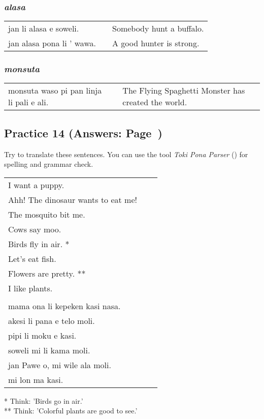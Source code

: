 \subsubsection*{\textit{alasa}}
\begin{supertabular}{p{5,5cm}|ll}
jan li alasa e soweli. && Somebody hunt a buffalo. \\
jan alasa pona li ' wawa. && A good hunter is strong. \\
\end{supertabular}

\subsubsection*{\textit{monsuta}}
\begin{supertabular}{p{5,5cm}|ll}
monsuta waso pi pan linja li pali e ali. &&  The Flying Spaghetti Monster has created the world. \\
\end{supertabular}

\newpage
\subsection*{Practice 14 (Answers: Page~\pageref{'living_things'})}
%
Try to translate these sentences. 
You can use the tool \textit{Toki Pona Parser} (\cite{www:rowa:02}) for spelling and grammar check. 

\begin{supertabular}{p{5,5cm}|ll}
I want a puppy. &&   \\ %
Ahh! The dinosaur wants to eat me!  &&  \\ %
The mosquito bit me.  &&  \\ %
Cows say moo.  &&  \\ %
Birds fly in air. * &&  \\ %
Let's eat fish.  &&  \\ %
Flowers are pretty. ** &&  \\ %
I like plants. &&   \\ %
 && \\ %
mama ona li kepeken kasi nasa.  &&  \\ %
akesi li pana e telo moli. &&  \\  %
pipi li moku e kasi.  &&  \\ %
soweli mi li kama moli.  &&  \\ %
jan Pawe o, mi wile ala moli. && \\   %
mi lon ma kasi. &&   \\ %
\end{supertabular} 

* Think: 'Birds go in air.' \\
** Think: 'Colorful plants are good to see.' 

